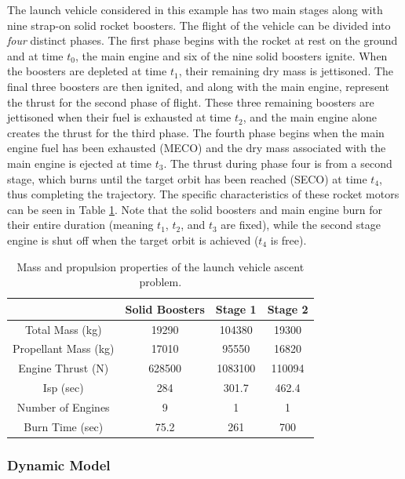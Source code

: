 \documentclass[10pt]{article}
\begin{document}
The launch vehicle considered in this example has two main stages
along with nine strap-on solid rocket boosters.  The flight of the
vehicle can be divided into {\em four} distinct phases.  The first
phase begins with the rocket at rest on the ground and at time $t_0$,
the main engine and six of the nine solid boosters ignite.  When the
boosters are depleted at time $t_1$, their remaining dry mass is
jettisoned. The final three boosters are then ignited, and along with the
main engine, represent the thrust for the second phase of flight.
These three remaining boosters are jettisoned when their fuel is
exhausted at time $t_2$, and the main engine alone creates the thrust
for the third phase.   The fourth phase begins when the main engine
fuel has been exhausted (MECO) and the dry mass associated with the
main engine is ejected at time $t_3$.   The thrust during phase four
is from a second stage, which burns until the target orbit has been
reached (SECO) at time $t_4$, thus completing the trajectory.  The
specific characteristics of these rocket motors can be seen in Table
\ref{table: launch vehicle properties}.  Note that the solid boosters
and main engine burn for their entire duration (meaning $t_1$, $t_2$,
and $t_3$ are fixed), while the second stage engine is shut off when
the target orbit is achieved ($t_4$ is free).

\begin{table}[htdp]
\centering
\caption{Mass and propulsion properties of the launch vehicle ascent
  problem. \label{table: launch vehicle properties}}
\begin{tabular}{|c|c|c|c|}
\hline
 & Solid Boosters & Stage 1 & Stage 2 \\
 \hline \hline
 Total Mass (kg) & 19290 & 104380 & 19300 \\
 \hline
 Propellant Mass (kg) & 17010 & 95550 & 16820 \\
 \hline
 Engine Thrust (N) & 628500 & 1083100 & 110094 \\
 \hline
 Isp (sec) & 284 & 301.7 & 462.4 \\
 \hline
 Number of Engines & 9 & 1 & 1 \\
 \hline
 Burn Time (sec) & 75.2 & 261 & 700 \\
 \hline
\end{tabular}
\end{table}

\subsubsection{Dynamic Model}
\end{document}
